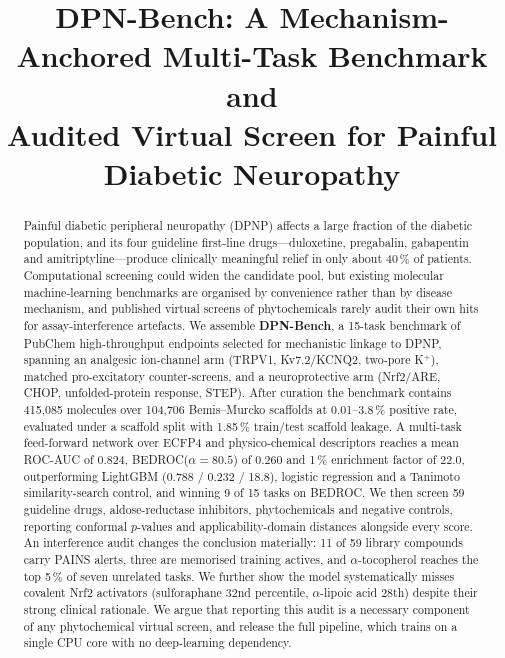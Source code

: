 \documentclass[conference]{IEEEtran}
\begin{document}
\title{DPN-Bench: A Mechanism-Anchored Multi-Task Benchmark and\\
Audited Virtual Screen for Painful Diabetic Neuropathy}

\author{
}

\maketitle

\begin{abstract}
Painful diabetic peripheral neuropathy (DPNP) affects a large fraction of the
diabetic population, and its four guideline first-line drugs---duloxetine,
pregabalin, gabapentin and amitriptyline---produce clinically meaningful relief
in only about 40\,\% of patients. Computational screening could widen the
candidate pool, but existing molecular machine-learning benchmarks are organised
by convenience rather than by disease mechanism, and published virtual screens
of phytochemicals rarely audit their own hits for assay-interference artefacts.
We assemble \textbf{DPN-Bench}, a 15-task benchmark of PubChem high-throughput
endpoints selected for mechanistic linkage to DPNP, spanning an analgesic
ion-channel arm (TRPV1, Kv7.2/KCNQ2, two-pore K$^+$), matched pro-excitatory
counter-screens, and a neuroprotective arm (Nrf2/ARE, CHOP, unfolded-protein
response, STEP). After curation the benchmark contains 415{,}085 molecules over
104{,}706 Bemis--Murcko scaffolds at 0.01--3.8\,\% positive rate, evaluated under
a scaffold split with 1.85\,\% train/test scaffold leakage. A multi-task
feed-forward network over ECFP4 and physico-chemical descriptors reaches a mean
ROC-AUC of 0.824, BEDROC($\alpha{=}80.5$) of 0.260 and 1\,\% enrichment factor of
22.0, outperforming LightGBM (0.788 / 0.232 / 18.8), logistic regression and a
Tanimoto similarity-search control, and winning 9 of 15 tasks on BEDROC. We then
screen 59 guideline drugs, aldose-reductase inhibitors, phytochemicals and
negative controls, reporting conformal $p$-values and applicability-domain
distances alongside every score. An interference audit changes the conclusion
materially: 11 of 59 library compounds carry PAINS alerts, three are memorised
training actives, and $\alpha$-tocopherol reaches the top 5\,\% of seven
unrelated tasks. We further show the model systematically misses covalent
Nrf2 activators (sulforaphane 32nd percentile, $\alpha$-lipoic acid 28th)
despite their strong clinical rationale. We argue that reporting this audit is a
necessary component of any phytochemical virtual screen, and release the full
pipeline, which trains on a single CPU core with no deep-learning dependency.
\end{abstract}
\end{document}
